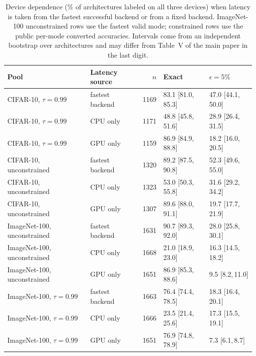 \begin{table}[!htbp]
\centering
\caption{Device dependence (\% of architectures labeled on all three devices)
when latency is taken from the fastest successful backend or from a fixed
backend. ImageNet-100 unconstrained rows use the fastest valid mode;
constrained rows use the public per-mode converted accuracies. Intervals
come from an independent bootstrap over architectures and may differ from
Table~V of the main paper in the last digit.}
\label{tab:backend}
\footnotesize
\begin{tabular}{@{}llrll@{}}
\toprule
\textbf{Pool} & \textbf{Latency source} & $n$ & \textbf{Exact} & \textbf{$\epsilon=5\%$}\\
\midrule
CIFAR-10, $\tau=0.99$ & fastest backend & 1169 & 83.1 [81.0,\,85.3] & 47.0 [44.1,\,50.0] \\
CIFAR-10, $\tau=0.99$ & CPU only & 1171 & 48.8 [45.8,\,51.6] & 28.9 [26.4,\,31.5] \\
CIFAR-10, $\tau=0.99$ & GPU only & 1159 & 86.9 [84.9,\,88.8] & 18.2 [16.0,\,20.5] \\
\midrule
CIFAR-10, unconstrained & fastest backend & 1320 & 89.2 [87.5,\,90.8] & 52.3 [49.6,\,55.0] \\
CIFAR-10, unconstrained & CPU only & 1323 & 53.0 [50.3,\,55.8] & 31.6 [29.2,\,34.2] \\
CIFAR-10, unconstrained & GPU only & 1307 & 89.6 [88.0,\,91.1] & 19.7 [17.7,\,21.9] \\
\midrule
ImageNet-100, unconstrained & fastest backend & 1631 & 90.7 [89.3,\,92.0] & 28.0 [25.8,\,30.1] \\
ImageNet-100, unconstrained & CPU only & 1668 & 21.0 [18.9,\,23.0] & 16.3 [14.5,\,18.2] \\
ImageNet-100, unconstrained & GPU only & 1651 & 86.9 [85.3,\,88.6] & 9.5 [8.2,\,11.0] \\
\midrule
ImageNet-100, $\tau=0.99$ & fastest backend & 1663 & 76.4 [74.4,\,78.5] & 18.3 [16.4,\,20.1] \\
ImageNet-100, $\tau=0.99$ & CPU only & 1666 & 23.5 [21.4,\,25.6] & 17.3 [15.5,\,19.1] \\
ImageNet-100, $\tau=0.99$ & GPU only & 1651 & 76.9 [74.8,\,78.9] & 7.3 [6.1,\,8.7] \\
\bottomrule
\end{tabular}
\end{table}

